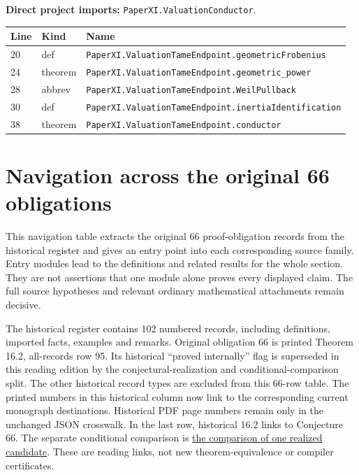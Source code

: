 \documentclass[10pt,oneside]{book}
\begin{document}
\textbf{Direct project imports:} \nolinkurl{PaperXI.ValuationConductor}.

\begin{longtable}{@{}p{}p{}p{}@{}}\toprule Line&Kind&Name\\\midrule\endhead

20&def&\nolinkurl{PaperXI.ValuationTameEndpoint.geometricFrobenius}\\

24&theorem&\nolinkurl{PaperXI.ValuationTameEndpoint.geometric_power}\\

28&abbrev&\nolinkurl{PaperXI.ValuationTameEndpoint.WeilPullback}\\

30&def&\nolinkurl{PaperXI.ValuationTameEndpoint.inertiaIdentification}\\

38&theorem&\nolinkurl{PaperXI.ValuationTameEndpoint.conductor}\\

\bottomrule\end{longtable}

\chapter{Navigation across the original 66 obligations}

This navigation table extracts the original 66 proof-obligation records from the historical register and gives an entry point into each corresponding source family. Entry modules lead to the definitions and related results for the whole section. They are not assertions that one module alone proves every displayed claim. The full source hypotheses and relevant ordinary mathematical attachments remain decisive.

The historical register contains 102 numbered records, including definitions, imported facts, examples and remarks. Original obligation 66 is printed Theorem 16.2, all-records row 95. Its historical ``proved internally'' flag is superseded in this reading edition by the conjectural-realization and conditional-comparison split. The other historical record types are excluded from this 66-row table. The printed numbers in this historical column now link to the corresponding current monograph destinations. Historical PDF page numbers remain only in the unchanged JSON crosswalk. In the last row, historical 16.2 links to Conjecture 66. The separate conditional comparison is \href{https://komorebi.invalid/b07/current_comparison}{the comparison of one realized candidate}. These are reading links, not new theorem-equivalence or compiler certificates.
\end{document}
